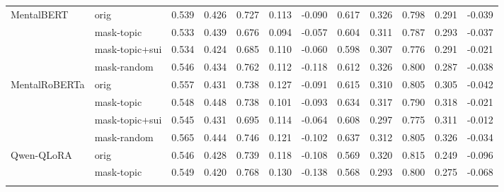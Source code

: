 \begin{table}[t]
\begin{tabular}{llcccccccccc}
\addlinespace[2pt]
MentalBERT & orig & 0.539 & 0.426 & 0.727 & 0.113 & -0.090 & 0.617 & 0.326 & 0.798 & 0.291 & -0.039 \\
 & mask-topic & 0.533 & 0.439 & 0.676 & 0.094 & -0.057 & 0.604 & 0.311 & 0.787 & 0.293 & -0.037 \\
 & mask-topic+sui & 0.534 & 0.424 & 0.685 & 0.110 & -0.060 & 0.598 & 0.307 & 0.776 & 0.291 & -0.021 \\
 & mask-random & 0.546 & 0.434 & 0.762 & 0.112 & -0.118 & 0.612 & 0.326 & 0.800 & 0.287 & -0.038 \\
\addlinespace[2pt]
MentalRoBERTa & orig & 0.557 & 0.431 & 0.738 & 0.127 & -0.091 & 0.615 & 0.310 & 0.805 & 0.305 & -0.042 \\
 & mask-topic & 0.548 & 0.448 & 0.738 & 0.101 & -0.093 & 0.634 & 0.317 & 0.790 & 0.318 & -0.021 \\
 & mask-topic+sui & 0.545 & 0.431 & 0.695 & 0.114 & -0.064 & 0.608 & 0.297 & 0.775 & 0.311 & -0.012 \\
 & mask-random & 0.565 & 0.444 & 0.746 & 0.121 & -0.102 & 0.637 & 0.312 & 0.805 & 0.326 & -0.034 \\
\addlinespace[2pt]
Qwen-QLoRA & orig & 0.546 & 0.428 & 0.739 & 0.118 & -0.108 & 0.569 & 0.320 & 0.815 & 0.249 & -0.096 \\
 & mask-topic & 0.549 & 0.420 & 0.768 & 0.130 & -0.138 & 0.568 & 0.293 & 0.800 & 0.275 & -0.068 \\
\addlinespace[2pt]
\bottomrule
\end{tabular}
\end{table}
